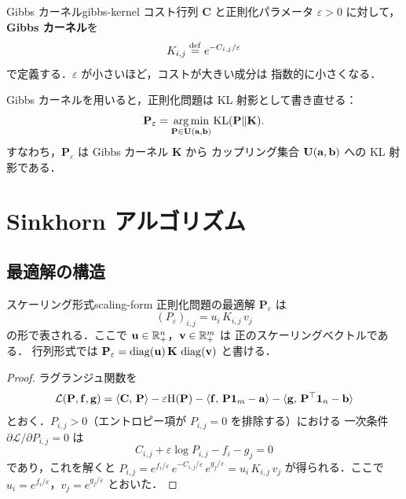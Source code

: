 \begin{definition}{Gibbs カーネル}{gibbs-kernel}
  コスト行列 $\mathbf{C}$ と正則化パラメータ $\varepsilon > 0$ に対して，
  \textbf{Gibbs カーネル}を
  \[
    K_{i,j} \overset{\mathrm{def}}{=} e^{-C_{i,j}/\varepsilon}
  \]
  で定義する．$\varepsilon$ が小さいほど，コストが大きい成分は
  指数的に小さくなる．
\end{definition}

Gibbs カーネルを用いると，正則化問題は KL 射影として書き直せる：
\[
  \mathbf{P}_\varepsilon
  = \operatorname*{arg\,min}_{\mathbf{P} \in \mathbf{U}(\mathbf{a}, \mathbf{b})}
  \mathrm{KL}(\mathbf{P} \| \mathbf{K}).
\]
すなわち，$\mathbf{P}_\varepsilon$ は Gibbs カーネル $\mathbf{K}$ から
カップリング集合 $\mathbf{U}(\mathbf{a}, \mathbf{b})$ への KL 射影である．

\section{Sinkhorn アルゴリズム}
\label{sec:sinkhorn}

\subsection{最適解の構造}

\begin{proposition}{スケーリング形式}{scaling-form}
  正則化問題の最適解 $\mathbf{P}_\varepsilon$ は
  \[
    (P_\varepsilon)_{i,j} = u_i \, K_{i,j} \, v_j
  \]
  の形で表される．ここで $\mathbf{u} \in \mathbb{R}_{+}^n$，$\mathbf{v} \in \mathbb{R}_{+}^m$ は
  正のスケーリングベクトルである．
  行列形式では $\mathbf{P}_\varepsilon = \operatorname{diag}(\mathbf{u}) \, \mathbf{K} \, \operatorname{diag}(\mathbf{v})$ と書ける．
\end{proposition}

\begin{proof}
  ラグランジュ関数を
  \[
    \mathcal{L}(\mathbf{P}, \mathbf{f}, \mathbf{g})
    = \langle \mathbf{C},\, \mathbf{P} \rangle - \varepsilon \mathrm{H}(\mathbf{P})
    - \langle \mathbf{f},\, \mathbf{P}\mathbf{1}_m - \mathbf{a} \rangle
    - \langle \mathbf{g},\, \mathbf{P}^\top \mathbf{1}_n - \mathbf{b} \rangle
  \]
  とおく．$P_{i,j} > 0$（エントロピー項が $P_{i,j} = 0$ を排除する）における
  一次条件 $\partial \mathcal{L} / \partial P_{i,j} = 0$ は
  \[
    C_{i,j} + \varepsilon \log P_{i,j} - f_i - g_j = 0
  \]
  であり，これを解くと
  $P_{i,j} = e^{f_i/\varepsilon} \, e^{-C_{i,j}/\varepsilon} \, e^{g_j/\varepsilon}
  = u_i \, K_{i,j} \, v_j$
  が得られる．ここで $u_i = e^{f_i/\varepsilon}$，$v_j = e^{g_j/\varepsilon}$ とおいた．
\end{proof}

